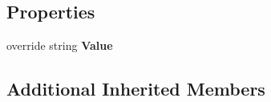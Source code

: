 \subsection*{Properties}
\begin{DoxyCompactItemize}
\item 
\hypertarget{class_simple_j_s_o_n_1_1_j_s_o_n_data_ac0d90d4812d7d6f52379e2f68569a87b}{override string {\bfseries Value}}\label{class_simple_j_s_o_n_1_1_j_s_o_n_data_ac0d90d4812d7d6f52379e2f68569a87b}

\end{DoxyCompactItemize}
\subsection*{Additional Inherited Members}
